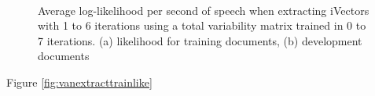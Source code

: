 \begin{figure}[hbt]
	\begin{center}
		\\
	\end{center}
	\caption{Average log-likelihood per second of speech when extracting iVectors with 1 to 6 iterations using a total variability matrix trained in 0 to 7 iterations. (a) likelihood for training documents, (b) development documents}
	\label{fig:vanextractlike}
\end{figure}

Figure \ref{fig:vanextracttrainlike}














